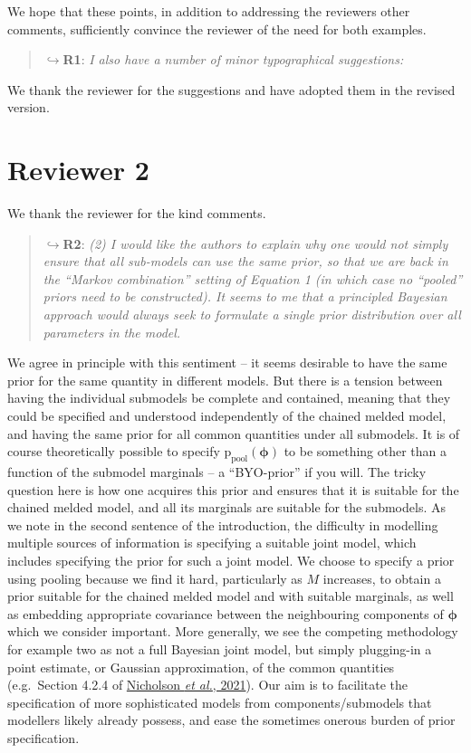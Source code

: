 \documentclass[
  10pt,
  a4paper,
]{article}
\newcommand{\pd}{\text{p}}
\newcommand{\Nm}{M}
\begin{document}
We hope that these points, in addition to addressing the reviewers other
comments, sufficiently convince the reviewer of the need for both
examples.

\begin{quote}
\(\hookrightarrow\)\textbf{R1}: \emph{I also have a number of minor
typographical suggestions:}
\end{quote}

We thank the reviewer for the suggestions and have adopted them in the
revised version.

\hypertarget{reviewer-2}{%
\section*{Reviewer 2}\label{reviewer-2}}

We thank the reviewer for the kind comments.

\begin{quote}
\(\hookrightarrow\)\textbf{R2}: \emph{(2) I would like the authors to
explain why one would not simply ensure that all sub-models can use the
same prior, so that we are back in the ``Markov combination'' setting of
Equation 1 (in which case no ``pooled'' priors need to be constructed).
It seems to me that a principled Bayesian approach would always seek to
formulate a single prior distribution over all parameters in the model.}
\end{quote}

We agree in principle with this sentiment -- it seems desirable to have
the same prior for the same quantity in different models. But there is a
tension between having the individual submodels be complete and
contained, meaning that they could be specified and understood
independently of the chained melded model, and having the same prior for
all common quantities under all submodels. It is of course theoretically
possible to specify \(\pd_{\text{pool}}(\boldsymbol{\phi})\) to be
something other than a function of the submodel marginals -- a
``BYO-prior'' if you will. The tricky question here is how one acquires
this prior and ensures that it is suitable for the chained melded model,
and all its marginals are suitable for the submodels. As we note in the
second sentence of the introduction, the difficulty in modelling
multiple sources of information is specifying a suitable joint model,
which includes specifying the prior for such a joint model. We choose to
specify a prior using pooling because we find it hard, particularly as
\(\Nm\) increases, to obtain a prior suitable for the chained melded
model and with suitable marginals, as well as embedding appropriate
covariance between the neighbouring components of \(\boldsymbol{\phi}\)
which we consider important. More generally, we see the competing
methodology for example two as not a full Bayesian joint model, but
simply plugging-in a point estimate, or Gaussian approximation, of the
common quantities (e.g.~Section 4.2.4 of
\protect\hyperlink{ref-nicholson_interoperability_2021}{Nicholson
\emph{et al.}, 2021}). Our aim is to facilitate the specification of
more sophisticated models from components/submodels that modellers
likely already possess, and ease the sometimes onerous burden of prior
specification.
\end{document}
